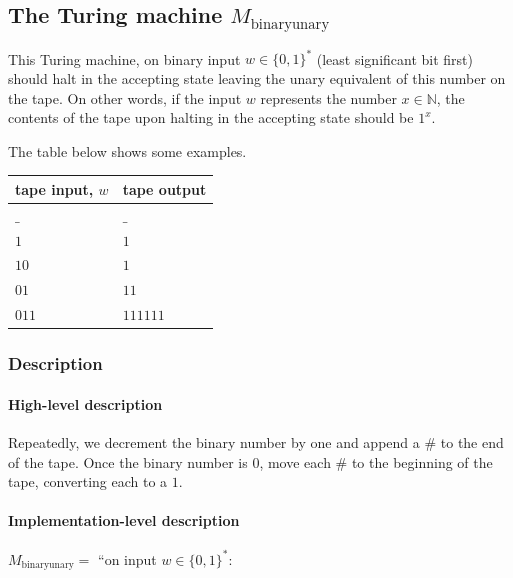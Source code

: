 \subsection{The Turing machine $M_\text{binaryunary}$}

This Turing machine, on binary input $w\in \{0,1\}^*$ (least significant bit first) should halt in the accepting state leaving the unary equivalent of this number on the tape. On other words, if the input $w$ represents the number $x\in\mathbb{N}$, the contents of the tape upon halting in the accepting state should be $1^x$. 

The table below shows some examples.

\begin{center}
    \begin{tabular}{l|l}
         tape input, $w$ & tape output \\
         \hline
         $\_$ & $\_$ \\
         $1$ & $1$ \\
         $10$ & $1$ \\
         $01$ & $11$ \\
         $011$ & $111111$
    \end{tabular}
\end{center}


\subsubsection{Description}

\paragraph{High-level description}
Repeatedly, we decrement the binary number by one and append a $\#$ to the end of the tape. Once the binary number is $0$, move each $\#$ to the beginning of the tape, converting each to a $1$.

\paragraph{Implementation-level description}
$M_{\text{binaryunary}}=$
``on input $w \in \{0,1\}^*$:

